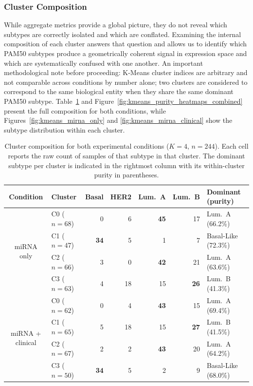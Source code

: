 \subsubsection{Cluster Composition}

While aggregate metrics provide a global picture, they do not reveal which subtypes are
correctly isolated and which are conflated. Examining the internal composition of each
cluster answers that question and allows us to identify which PAM50 subtypes produce a
geometrically coherent signal in expression space and which are systematically confused
with one another. An important methodological note before proceeding: K-Means cluster
indices are arbitrary and not comparable across conditions by number alone; two clusters
are considered to correspond to the same biological entity when they share the same
dominant PAM50 subtype. Table~\ref{tab:kmeans_both_composition} and
Figure~\ref{fig:kmeans_purity_heatmaps_combined} present the full composition for both
conditions, while Figures~\ref{fig:kmeans_mirna_only} and \ref{fig:kmeans_mirna_clinical} show the subtype distribution
within each cluster.

\begin{table}[!ht]
\centering
\caption{Cluster composition for both experimental conditions ($K = 4$, $n = 244$).
Each cell reports the raw count of samples of that subtype in that cluster. The dominant
subtype per cluster is indicated in the rightmost column with its within-cluster purity
in parentheses.}
\label{tab:kmeans_both_composition}
\begin{tabular}{clrrrrl}
\hline
\textbf{Condition} & \textbf{Cluster} & \textbf{Basal} & \textbf{HER2} &
\textbf{Lum.\ A} & \textbf{Lum.\ B} & \textbf{Dominant (purity)} \\
\hline
\multirow{4}{*}{miRNA only}
 & C0 ($n=68$) &  0 &  6 & \textbf{45} & 17 & Lum.\ A (66.2\%) \\
 & C1 ($n=47$) & \textbf{34} &  5 &  1 &  7 & Basal-Like (72.3\%) \\
 & C2 ($n=66$) &  3 &  0 & \textbf{42} & 21 & Lum.\ A (63.6\%) \\
 & C3 ($n=63$) &  4 & 18 & 15 & \textbf{26} & Lum.\ B (41.3\%) \\
\hline
\multirow{4}{*}{miRNA + clinical}
 & C0 ($n=62$) &  0 &  4 & \textbf{43} & 15 & Lum.\ A (69.4\%) \\
 & C1 ($n=65$) &  5 & 18 & 15 & \textbf{27} & Lum.\ B (41.5\%) \\
 & C2 ($n=67$) &  2 &  2 & \textbf{43} & 20 & Lum.\ A (64.2\%) \\
 & C3 ($n=50$) & \textbf{34} &  5 &  2 &  9 & Basal-Like (68.0\%) \\
\hline
\end{tabular}
\end{table}

